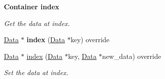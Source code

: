 \begin{Indent}{\bf Container index}\par
{\em Get the data at index. }\begin{DoxyCompactItemize}
\item 
\hyperlink{classcreek_1_1_data}{Data} $\ast$ {\bfseries index} (\hyperlink{classcreek_1_1_data}{Data} $\ast$key) override\hypertarget{classcreek_1_1_object_a3f95a8e789dcd2bb42bce0ce83588b22}{}\label{classcreek_1_1_object_a3f95a8e789dcd2bb42bce0ce83588b22}

\item 
\hyperlink{classcreek_1_1_data}{Data} $\ast$ \hyperlink{classcreek_1_1_object_af8c06f9ea9535d76ca9cf4dff72df4e0}{index} (\hyperlink{classcreek_1_1_data}{Data} $\ast$key, \hyperlink{classcreek_1_1_data}{Data} $\ast$new\+\_\+data) override\hypertarget{classcreek_1_1_object_af8c06f9ea9535d76ca9cf4dff72df4e0}{}\label{classcreek_1_1_object_af8c06f9ea9535d76ca9cf4dff72df4e0}

\begin{DoxyCompactList}\small\item\em Set the data at index. \end{DoxyCompactList}\end{DoxyCompactItemize}
\end{Indent}
